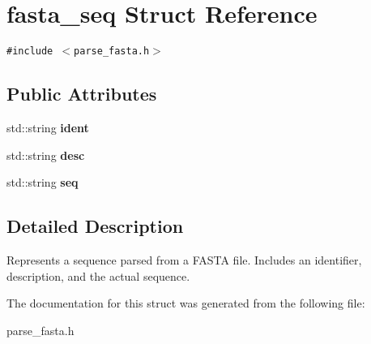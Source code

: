 \section{fasta\_\-seq Struct Reference}
\label{structfasta__seq}
{\tt \#include $<$parse\_\-fasta.h$>$}

\subsection*{Public Attributes}
\begin{CompactItemize}
\item 
std::string {\bf ident}\label{structfasta__seq_o0}

\item 
std::string {\bf desc}\label{structfasta__seq_o1}

\item 
std::string {\bf seq}\label{structfasta__seq_o2}

\end{CompactItemize}


\subsection{Detailed Description}
Represents a sequence parsed from a FASTA file. Includes an identifier, description, and the actual sequence. 



The documentation for this struct was generated from the following file:\begin{CompactItemize}
\item 
parse\_\-fasta.h\end{CompactItemize}
